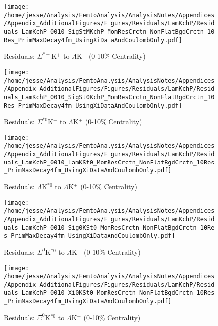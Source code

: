 \documentclass[/home/jesse/Analysis/FemtoAnalysis/AnalysisNotes/AnalysisNoteJBuxton.tex]{subfiles}
\begin{document}
\begin{figure}[h]
  \centering
  \texttt{[image: /home/jesse/Analysis/FemtoAnalysis/AnalysisNotes/Appendices/Appendix\_AdditionalFigures/Figures/Residuals/LamKchP/Residuals\_LamKchP\_0010\_SigStMKchP\_MomResCrctn\_NonFlatBgdCrctn\_10Res\_PrimMaxDecay4fm\_UsingXiDataAndCoulombOnly.pdf]}
  \caption[Residuals: $\Sigma^{*-}$K$^{+}$ to $\Lambda$K$^{+}$ (0-10\% Centrality)]{Residuals: $\Sigma^{*-}$K$^{+}$ to $\Lambda$K$^{+}$ (0-10\% Centrality)}
  \label{fig:Res_LamKchP_0010_SigStMKchP}
\end{figure}

\begin{figure}[h]
  \centering
  \texttt{[image: /home/jesse/Analysis/FemtoAnalysis/AnalysisNotes/Appendices/Appendix\_AdditionalFigures/Figures/Residuals/LamKchP/Residuals\_LamKchP\_0010\_SigSt0KchP\_MomResCrctn\_NonFlatBgdCrctn\_10Res\_PrimMaxDecay4fm\_UsingXiDataAndCoulombOnly.pdf]}
  \caption[Residuals: $\Sigma^{*0}$K$^{+}$ to $\Lambda$K$^{+}$ (0-10\% Centrality)]{Residuals: $\Sigma^{*0}$K$^{+}$ to $\Lambda$K$^{+}$ (0-10\% Centrality)}
  \label{fig:Res_LamKchP_0010_SigSt0KchP}
\end{figure}


\begin{figure}[h]
  \centering
  \texttt{[image: /home/jesse/Analysis/FemtoAnalysis/AnalysisNotes/Appendices/Appendix\_AdditionalFigures/Figures/Residuals/LamKchP/Residuals\_LamKchP\_0010\_LamKSt0\_MomResCrctn\_NonFlatBgdCrctn\_10Res\_PrimMaxDecay4fm\_UsingXiDataAndCoulombOnly.pdf]}
  \caption[Residuals: $\Lambda$K$^{*0}$ to $\Lambda$K$^{+}$ (0-10\% Centrality)]{Residuals: $\Lambda$K$^{*0}$ to $\Lambda$K$^{+}$ (0-10\% Centrality)}
  \label{fig:Res_LamKchP_0010_LamKSt0}
\end{figure}


\begin{figure}[h]
  \centering
  \texttt{[image: /home/jesse/Analysis/FemtoAnalysis/AnalysisNotes/Appendices/Appendix\_AdditionalFigures/Figures/Residuals/LamKchP/Residuals\_LamKchP\_0010\_Sig0KSt0\_MomResCrctn\_NonFlatBgdCrctn\_10Res\_PrimMaxDecay4fm\_UsingXiDataAndCoulombOnly.pdf]}
  \caption[Residuals: $\Sigma^{0}$K$^{*0}$ to $\Lambda$K$^{+}$ (0-10\% Centrality)]{Residuals: $\Sigma^{0}$K$^{*0}$ to $\Lambda$K$^{+}$ (0-10\% Centrality)}
  \label{fig:Res_LamKchP_0010_Sig0KSt0}
\end{figure}


\begin{figure}[h]
  \centering
  \texttt{[image: /home/jesse/Analysis/FemtoAnalysis/AnalysisNotes/Appendices/Appendix\_AdditionalFigures/Figures/Residuals/LamKchP/Residuals\_LamKchP\_0010\_Xi0KSt0\_MomResCrctn\_NonFlatBgdCrctn\_10Res\_PrimMaxDecay4fm\_UsingXiDataAndCoulombOnly.pdf]}
  \caption[Residuals: $\Xi^{0}$K$^{*0}$ to $\Lambda$K$^{+}$ (0-10\% Centrality)]{Residuals: $\Xi^{0}$K$^{*0}$ to $\Lambda$K$^{+}$ (0-10\% Centrality)}
  \label{fig:Res_LamKchP_0010_Xi0KSt0}
\end{figure}
\end{document}

